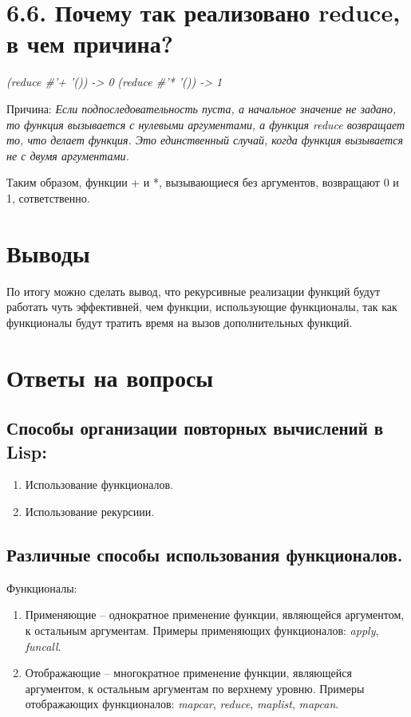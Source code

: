 \documentclass[a4paper,12pt]{article}
\begin{document}
 	
 	\section*{6.6. Почему так реализовано reduce, в чем причина?
 	}
 
 	\textit{(reduce \#'+ '()) -> 0}
 	\textit{(reduce \#'* '()) -> 1}
 	
 	Причина:
 	\textit{Если подпоследовательность пуста, а начальное значение не задано, то функция вызывается с нулевыми аргументами, а функция reduce возвращает то, что делает функция. Это единственный случай, когда функция вызывается не с двумя аргументами.}~\cite{reduce}
 	
 	Таким образом, функции + и *, вызывающиеся без аргументов, возвращают 0 и 1, сответственно.
 	
 	
 	\section*{Выводы}
 	
 	По итогу можно сделать вывод, что рекурсивные реализации функций будут работать чуть эффективней, чем функции, использующие функционалы, так как функционалы будут тратить время на вызов дополнительных функций.
 	
 	\section*{Ответы на вопросы}
 	
 	\subsection*{Способы организации повторных вычислений в Lisp:}
 	
 	\begin{enumerate}
 		\item Использование функционалов.
 		\item Использование рекурсиии.
 	\end{enumerate}
 	
 	\subsection*{Различные способы использования функционалов.}
 	
 	Функционалы:
 	
 	\begin{enumerate}
 		\item  Применяющие – однократное применение функции, являющейся аргументом, к остальным аргументам. Примеры применяющих функционалов: \textit{apply}, \textit{funcall}.
 		\item Отображающие – многократное применение функции, являющейся аргументом, к остальным аргументам по верхнему уровню. Примеры отображающих функционалов: \textit{mapcar}, \textit{reduce}, \textit{maplist}, \textit{mapcan}.
 	\end{enumerate}
 	
\end{document}
